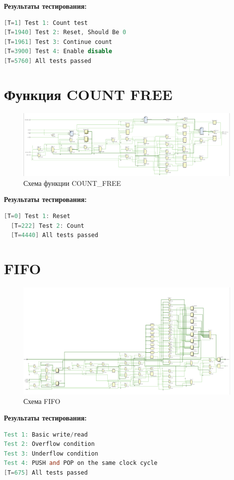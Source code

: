 \documentclass[12pt,onecolumn]{article}
\begin{document}
\textbf{Результаты тестирования:}

\begin{lstlisting}[language=verilog]
[T=1] Test 1: Count test
[T=1940] Test 2: Reset, Should Be 0
[T=1961] Test 3: Continue count
[T=3900] Test 4: Enable disable
[T=5760] All tests passed
\end{lstlisting}

\section{Функция COUNT FREE}
\begin{figure}[H]
  \centering
  \includegraphics[width=\textwidth]{image/count-free.png}
  \caption{Схема функции COUNT\_FREE}
\end{figure}
\textbf{Результаты тестирования:}
\begin{lstlisting}[language=verilog]
  [T=0] Test 1: Reset
  [T=222] Test 2: Count
  [T=4440] All tests passed
\end{lstlisting}


\section{FIFO}
\begin{figure}[H]
  \centering
  \includegraphics[width=\textwidth]{image/fifo.png}
  \caption{Схема FIFO}
\end{figure}
\textbf{Результаты тестирования:}
\begin{lstlisting}[language=verilog]
Test 1: Basic write/read
Test 2: Overflow condition
Test 3: Underflow condition
Test 4: PUSH and POP on the same clock cycle
[T=675] All tests passed
\end{lstlisting}
\end{document}
